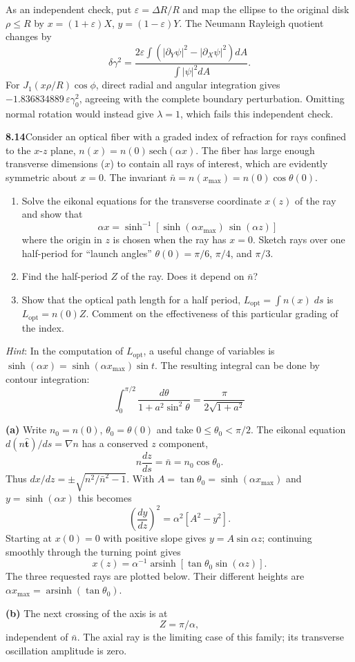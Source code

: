As an independent check, put $\varepsilon=\Delta R/R$ and map the
ellipse to the original disk $\rho\le R$ by
$x=(1+\varepsilon)X$, $y=(1-\varepsilon)Y$.
The Neumann Rayleigh quotient changes by
\[
\delta\gamma^2=\frac{2\varepsilon
\int(|\partial_Y\psi|^2-|\partial_X\psi|^2)dA}{\int|\psi|^2dA}.
\]
For $J_1(x\rho/R)\cos\phi$, direct radial and angular integration
gives $-1.836834889\,\varepsilon\gamma_0^2$, agreeing with the
complete boundary perturbation.  Omitting normal rotation would
instead give $\lambda=1$, which fails this independent check.

\par\bigskip
\noindent\textbf{8.14}\quad Consider an optical fiber with a graded index of refraction for rays confined to the $x$-$z$ plane, $n(x)=n(0)\,\mathrm{sech}(\alpha x)$. The fiber has large enough transverse dimensions ($x$) to contain all rays of interest, which are evidently symmetric about $x=0$. The invariant $\bar{n}=n(x_{\max})=n(0)\cos\theta(0)$.
\begin{enumerate}
\item[(a)] Solve the eikonal equations for the transverse coordinate $x(z)$ of the ray and show that
\[
\alpha x=\sinh^{-1}[\sinh(\alpha x_{\max})\,\sin(\alpha z)]
\]
where the origin in $z$ is chosen when the ray has $x=0$. Sketch rays over one half-period for ``launch angles'' $\theta(0)=\pi/6$, $\pi/4$, and $\pi/3$.
\item[(b)] Find the half-period $Z$ of the ray. Does it depend on $\bar{n}$?
\item[(c)] Show that the optical path length for a half period, $L_{\mathrm{opt}}=\int n(x)\;ds$ is $L_{\mathrm{opt}}=n(0)Z$. Comment on the effectiveness of this particular grading of the index.
\end{enumerate}
\emph{Hint}: In the computation of $L_{\mathrm{opt}}$, a useful change of variables is $\sinh(\alpha x)=\sinh(\alpha x_{\max})\sin t$. The resulting integral can be done by contour integration:
\[
\int_{0}^{\pi/2}\frac{d\theta}{1+a^{2}\sin^{2}\theta}=\frac{\pi}{2\sqrt{1+a^{2}}}
\]
\solution

\medskip\noindent\textbf{(a)} Write $n_0=n(0)$, $\theta_0=\theta(0)$ and take $0\leq\theta_0<\pi/2$.
The eikonal equation $d(n\widehat{\mathbf t})/ds=\nabla n$
has a conserved $z$ component,
\[
n\frac{dz}{ds}=\bar n=n_0\cos\theta_0.
\]
Thus $dx/dz=\pm\sqrt{n^2/\bar n^2-1}$.  With
$A=\tan\theta_0=\sinh(\alpha x_{\max})$ and
$y=\sinh(\alpha x)$ this becomes
\[
\left(\frac{dy}{dz}\right)^2
=\alpha^2\left[A^2-y^2\right].
\]
Starting at $x(0)=0$ with positive slope gives $y=A\sin\alpha z$;
continuing smoothly through the turning point gives
\[
\boxed{x(z)=\alpha^{-1}\operatorname{arsinh}
 [\tan\theta_0\sin(\alpha z)].}
\]
The three requested rays are plotted below.  Their different heights
are $\alpha x_{\max}=\operatorname{arsinh}(\tan\theta_0)$.
\begin{center}\end{center}
\medskip\noindent\textbf{(b)} The next crossing of the axis is at
\[
\boxed{Z=\pi/\alpha,}
\]
independent of $\bar n$.  The axial ray is the limiting case of this
family; its transverse oscillation amplitude is zero.

